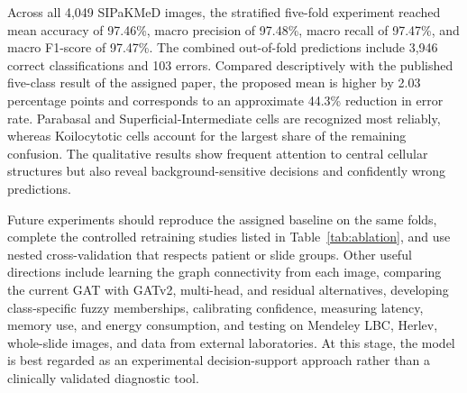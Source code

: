 \documentclass[10pt,conference]{IEEEtran}
\begin{document}
Across all 4,049 SIPaKMeD images, the stratified five-fold experiment reached mean accuracy of 97.46\%, macro precision of 97.48\%, macro recall of 97.47\%, and macro F1-score of 97.47\%. The combined out-of-fold predictions include 3,946 correct classifications and 103 errors. Compared descriptively with the published five-class result of the assigned paper, the proposed mean is higher by 2.03 percentage points and corresponds to an approximate 44.3\% reduction in error rate. Parabasal and Superficial-Intermediate cells are recognized most reliably, whereas Koilocytotic cells account for the largest share of the remaining confusion. The qualitative results show frequent attention to central cellular structures but also reveal background-sensitive decisions and confidently wrong predictions.

Future experiments should reproduce the assigned baseline on the same folds, complete the controlled retraining studies listed in Table~\ref{tab:ablation}, and use nested cross-validation that respects patient or slide groups. Other useful directions include learning the graph connectivity from each image, comparing the current GAT with GATv2, multi-head, and residual alternatives, developing class-specific fuzzy memberships, calibrating confidence, measuring latency, memory use, and energy consumption, and testing on Mendeley LBC, Herlev, whole-slide images, and data from external laboratories. At this stage, the model is best regarded as an experimental decision-support approach rather than a clinically validated diagnostic tool.

\FloatBarrier
\end{document}
